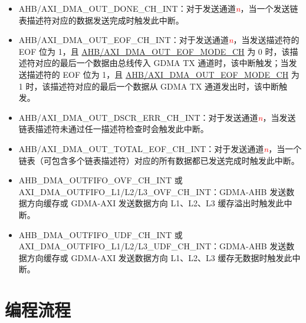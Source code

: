 \documentclass[main\_\_CN.tex]{subfiles}
\begin{document}
\begin{itemize}
    \item \label{int:GDMAOUTDONEINT}AHB/AXI\_DMA\_OUT\_DONE\_CH\_INT：对于发送通道\textcolor{red}{\it{n}}，当一个发送链表描述符对应的数据发送完成时触发此中断。
    \item \label{int:GDMAOUTEOFINT}AHB/AXI\_DMA\_OUT\_EOF\_CH\_INT：对于发送通道\textcolor{red}{\it{n}}，当发送描述符的 EOF 位为 1，且 \hyperref[fielddesc:AHBDMAOUTEOFMODECHN]{AHB/AXI\_DMA\_OUT\_EOF\_MODE\_CH} 为 0 时，该描述符对应的最后一个数据由总线传入 GDMA TX 通道时，该中断触发；当发送描述符的 EOF 位为 1，且 \hyperref[fielddesc:AHBDMAOUTEOFMODECHN]{AHB/AXI\_DMA\_OUT\_EOF\_MODE\_CH} 为 1 时，该描述符对应的最后一个数据从 GDMA TX 通道发出时，该中断触发。
    \item \label{int:GDMAOUTDSCRERRINT}AHB/AXI\_DMA\_OUT\_DSCR\_ERR\_CH\_INT：对于发送通道\textcolor{red}{\it{n}}，当发送链表描述符未通过任一描述符检查时会触发此中断。
    \item \label{int:GDMAOUTTOTALEOFINT}AHB/AXI\_DMA\_OUT\_TOTAL\_EOF\_CH\_INT：对于发送通道\textcolor{red}{\it{n}}，当一个链表（可包含多个链表描述符）对应的所有数据都已发送完成时触发此中断。
    \item \label{int:GDMAOUTFIFOOVFINT} AHB\_DMA\_OUTFIFO\_OVF\_CH\_INT 或 AXI\_DMA\_OUTFIFO\_L1/L2/L3\_OVF\_CH\_INT：GDMA-AHB 发送数据方向缓存或 GDMA-AXI 发送数据方向 L1、L2、L3 缓存溢出时触发此中断。
    \item \label{int:GDMAOUTFIFOUDFINT}AHB\_DMA\_OUTFIFO\_UDF\_CH\_INT 或 AXI\_DMA\_OUTFIFO\_L1/L2/L3\_UDF\_CH\_INT：GDMA-AHB 发送数据方向缓存或 GDMA-AXI 发送数据方向 L1、L2、L3 缓存无数据时触发此中断。
\end{itemize}


\section{编程流程}
\end{document}
